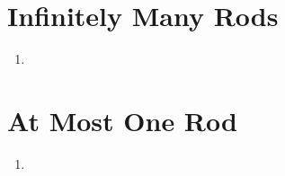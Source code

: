 \documentclass{article}
\begin{document}
\newpage
\section{Infinitely Many Rods}
\begin{enumerate}
    \item 
\end{enumerate}

\newpage
\section{At Most One Rod}
\begin{enumerate}
    \item 
\end{enumerate}
\end{document}
